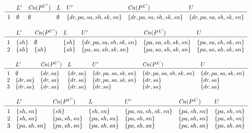 \documentclass{article}
\begin{document}
\[
\begin{array}{c@{\hspace{10pt}}llllll}
& L' & \mathit{Cn}(P^{U'}) & L
& U' & \mathit{Cn}(P^{L'}) & U \\\hline\\[-3mm]
1 & \emptyset & \emptyset & \emptyset & \{dr,pa,sa,sh,sk,sn\} & \{dr,pa,sa,sh,sk,sn\} & \{dr,pa,sa,sh,sk,sn\} \\ 
\end{array}
\]

\[
\begin{array}{c@{\hspace{10pt}}llllll}
& L' & \mathit{Cn}(P^{U'}) & L
& U' & \mathit{Cn}(P^{L'}) & U \\\hline\\[-3mm]
1 & \{sh\} & \emptyset & \{sh\} & \{dr,pa,sa,sh,sk,sn\} & \{pa,sa,sh,sk,sn\} & \{pa,sa,sh,sk,sn\} \\ 
2 & \{sh\} & \{sh\} & \{sh\} & \{pa,sa,sh,sk,sn\} & \{pa,sa,sh,sk,sn\} & \{pa,sa,sh,sk,sn\} \\ 
\end{array}
\]

\[
\begin{array}{c@{\hspace{10pt}}llllll}
& L' & \mathit{Cn}(P^{U'}) & L
& U' & \mathit{Cn}(P^{L'}) & U \\\hline\\[-3mm]
1 & \emptyset & \{dr,sa\} & \{dr,sa\} & \{dr,pa,sa,sk,sn\} & \{dr,pa,sa,sh,sk,sn\} & \{dr,pa,sa,sk,sn\} \\ 
2 & \{dr,sa\} & \{dr,sa\} & \{dr,sa\} & \{dr,pa,sa,sk,sn\} & \{dr,sa\} & \{dr,sa\} \\ 
3 & \{dr,sa\} & \{dr,sa\} & \{dr,sa\} & \{dr,sa\} & \{dr,sa\} & \{dr,sa\} \\ 
\end{array}
\]

\[
\begin{array}{c@{\hspace{10pt}}llllll}
& L' & \mathit{Cn}(P^{U'}) & L
& U' & \mathit{Cn}(P^{L'}) & U \\\hline\\[-3mm]
1 & \{sh,sn\} & \{sh\} & \{sh,sn\} & \{pa,sa,sh,sk,sn\} & \{pa,sh,sn\} & \{pa,sh,sn\} \\ 
2 & \{sh,sn\} & \{pa,sh,sn\} & \{pa,sh,sn\} & \{pa,sh,sn\} & \{pa,sh,sn\} & \{pa,sh,sn\} \\ 
3 & \{pa,sh,sn\} & \{pa,sh,sn\} & \{pa,sh,sn\} & \{pa,sh,sn\} & \{pa,sh,sn\} & \{pa,sh,sn\} \\ 
\end{array}
\]
\end{document}
